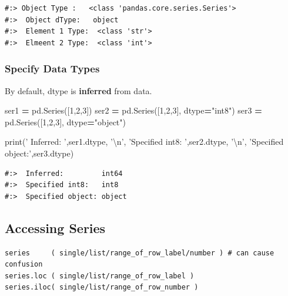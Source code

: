 \documentclass[
]{book}
\newenvironment{Shaded}{\begin{snugshade}}{\end{snugshade}}
\newcommand{\BuiltInTok}[1]{#1}
\newcommand{\CharTok}[1]{\textcolor[rgb]{0.5,0.5,0.5}{#1}}
\newcommand{\DecValTok}[1]{\textcolor[rgb]{0.06,0.06,0.06}{#1}}
\newcommand{\NormalTok}[1]{#1}
\newcommand{\OperatorTok}[1]{\textcolor[rgb]{0.43,0.43,0.43}{\textbf{#1}}}
\newcommand{\StringTok}[1]{\textcolor[rgb]{0.5,0.5,0.5}{#1}}
\begin{document}
\begin{verbatim}
#:> Object Type :   <class 'pandas.core.series.Series'> 
#:>  Object dType:   object 
#:>  Element 1 Type:  <class 'str'> 
#:>  Elmeent 2 Type:  <class 'int'>
\end{verbatim}

\hypertarget{specify-data-types}{%
\subsubsection{Specify Data Types}\label{specify-data-types}}

By default, dtype is \textbf{inferred} from data.

\begin{Shaded}
\begin{Highlighting}[]
\NormalTok{ser1 }\OperatorTok{=}\NormalTok{ pd.Series([}\DecValTok{1}\NormalTok{,}\DecValTok{2}\NormalTok{,}\DecValTok{3}\NormalTok{])}
\NormalTok{ser2 }\OperatorTok{=}\NormalTok{ pd.Series([}\DecValTok{1}\NormalTok{,}\DecValTok{2}\NormalTok{,}\DecValTok{3}\NormalTok{], dtype}\OperatorTok{=}\StringTok{"int8"}\NormalTok{)}
\NormalTok{ser3 }\OperatorTok{=}\NormalTok{ pd.Series([}\DecValTok{1}\NormalTok{,}\DecValTok{2}\NormalTok{,}\DecValTok{3}\NormalTok{], dtype}\OperatorTok{=}\StringTok{"object"}\NormalTok{)}

\BuiltInTok{print}\NormalTok{(}\StringTok{' Inferred:        '}\NormalTok{,ser1.dtype, }\StringTok{'}\CharTok{\textbackslash{}n}\StringTok{'}\NormalTok{,}
      \StringTok{'Specified int8:  '}\NormalTok{,ser2.dtype, }\StringTok{'}\CharTok{\textbackslash{}n}\StringTok{'}\NormalTok{,}
      \StringTok{'Specified object:'}\NormalTok{,ser3.dtype)}
\end{Highlighting}
\end{Shaded}

\begin{verbatim}
#:>  Inferred:         int64 
#:>  Specified int8:   int8 
#:>  Specified object: object
\end{verbatim}

\hypertarget{accessing-series}{%
\subsection{Accessing Series}\label{accessing-series}}

\begin{verbatim}
series     ( single/list/range_of_row_label/number ) # can cause confusion
series.loc ( single/list/range_of_row_label )
series.iloc( single/list/range_of_row_number )
\end{verbatim}
\end{document}

